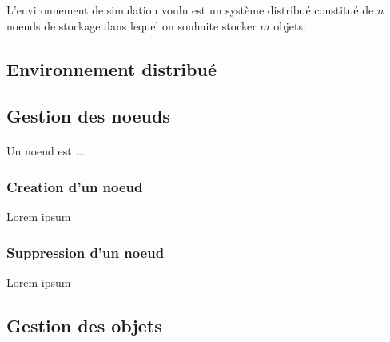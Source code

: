 \documentclass[12pt]{article}
\begin{document}
L'environnement de simulation voulu est un système distribué constitué de $n$ noeuds de stockage dans lequel on souhaite stocker $m$ objets.

\subsection{Environnement distribué}

	



\subsection{Gestion des noeuds}

\paragraph{} Un noeud est ...

\subsubsection{Creation d'un noeud}
Lorem ipsum


\subsubsection{Suppression d'un noeud}
Lorem ipsum


\subsection{Gestion des objets}
\end{document}
